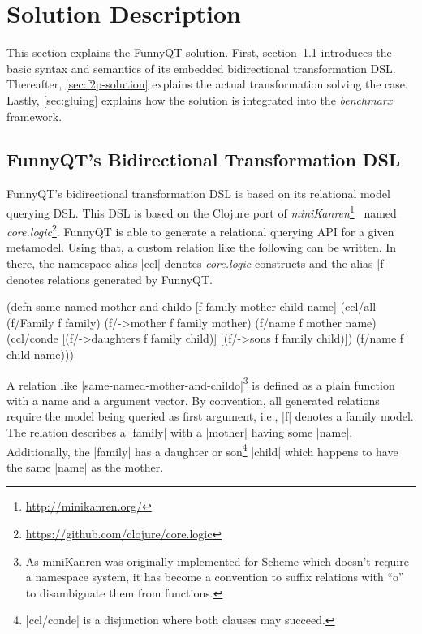 \documentclass[a4paper]{article}
\newcommand{\code}{\clojureinline}
\begin{document}
\section{Solution Description}
\label{sec:solution-description}

This section explains the FunnyQT solution.  First,
section~\ref{sec:bidi-intro} introduces the basic syntax and semantics of its
embedded bidirectional transformation DSL.  Thereafter, \ref{sec:f2p-solution}
explains the actual transformation solving the case.  Lastly, \ref{sec:gluing}
explains how the solution is integrated into the \emph{benchmarx} framework.


\subsection{FunnyQT's Bidirectional Transformation DSL}
\label{sec:bidi-intro}

FunnyQT's bidirectional transformation DSL is based on its relational model
querying DSL.  This DSL is based on the Clojure port of
\emph{miniKanren}\footnote{\url{http://minikanren.org/}}~\cite{byrdthesis}
named \emph{core.logic}\footnote{\url{https://github.com/clojure/core.logic}}.
FunnyQT is able to generate a relational querying API for a given metamodel.
Using that, a custom relation like the following can be written.  In there, the
namespace alias \code|ccl| denotes \emph{core.logic} constructs and the alias
\code|f| denotes relations generated by FunnyQT.

\begin{clojurecode}
(defn same-named-mother-and-childo [f family mother child name]
  (ccl/all
   (f/Family f family)
   (f/->mother f family mother)
   (f/name f mother name)
   (ccl/conde
    [(f/->daughters f family child)]
    [(f/->sons f family child)])
   (f/name f child name)))
\end{clojurecode}

A relation like \code|same-named-mother-and-childo|\footnote{As miniKanren was
  originally implemented for Scheme which doesn't require a namespace system,
  it has become a convention to suffix relations with ``o'' to disambiguate
  them from functions.} is defined as a plain function with a name and a
argument vector.  By convention, all generated relations require the model
being queried as first argument, i.e., \code|f| denotes a family model.  The
relation describes a \code|family| with a \code|mother| having some
\code|name|.  Additionally, the \code|family| has a daughter or
son\footnote{\clojureinline|ccl/conde| is a disjunction where both clauses may
  succeed.} \code|child| which happens to have the same \code|name| as the
mother.
\end{document}
